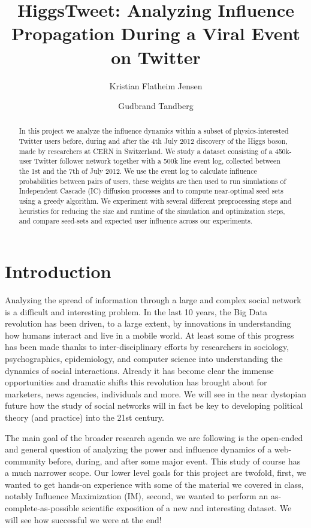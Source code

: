 \documentclass[sigconf]{acmart}
\title{HiggsTweet: Analyzing Influence Propagation During a Viral Event on Twitter}
\author{Kristian Flatheim Jensen}
\affiliation{%
\institution{Norwegian University of Science and Technology}
}
\author{Gudbrand Tandberg}
\affiliation{%
\institution{The University of British Colombia}
}
\begin{document}
\maketitle

\begin{abstract}
In this project we analyze the influence dynamics within a subset of physics-interested Twitter users before, during and after the 4th July 2012 discovery of the Higgs boson, made by researchers at CERN in Switzerland. We study a dataset consisting of a 450k-user Twitter follower network together with a 500k line event log, collected between the 1st and the 7th of July 2012. We use the event log to calculate influence probabilities between pairs of users, these weights are then used to run simulations of Independent Cascade (IC) diffusion processes and to compute near-optimal seed sets using a greedy algorithm. We experiment with several different preprocessing steps and heuristics for reducing the size and runtime of the simulation and optimization steps, and compare seed-sets and expected user influence across our experiments. 
\end{abstract}

\section{Introduction}

Analyzing the spread of information through a large and complex social network is a difficult and interesting problem. In the last 10 years, the Big Data revolution has been driven, to a large extent, by innovations in understanding how humans interact and live in a mobile world. At least some of this progress has been made thanks to inter-disciplinary efforts by researchers in sociology, psychographics, epidemiology, and computer science into understanding the dynamics of social interactions. Already it has become clear the immense opportunities and dramatic shifts this revolution has brought about for marketers, news agencies, individuals and more. We will see in the near dystopian future how the study of social networks will in fact be key to developing political theory (and practice) into the 21st century.

The main goal of the broader research agenda we are following is the open-ended and general question of analyzing the power and influence dynamics of a web-community before, during, and after some major event. This study of course has a much narrower scope. Our lower level goals for this project are twofold, first, we wanted to get hands-on experience with some of the material we covered in class, notably Influence Maximization (IM), second, we wanted to perform an as-complete-as-possible scientific exposition of a new and interesting dataset. We will see how successful we were at the end!
\end{document}
